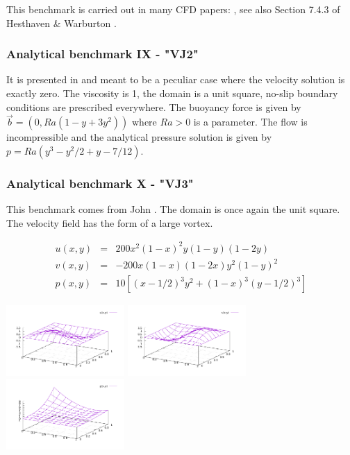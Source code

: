This benchmark is carried out in many CFD papers: \cite{coks04b,bodi11,ngpe12}, see also Section 7.4.3
of Hesthaven \& Warburton \cite{hewa08}.


\bscthesis {}

\subsubsection{Analytical benchmark IX \label{mms9} - "VJ2"}

It is presented in \cite{jolm17} and meant to be a peculiar case where the velocity solution 
is exactly zero. The viscosity is 1, the domain is a unit square, no-slip boundary conditions 
are prescribed everywhere. The buoyancy force is given by $\vec{b}=(0,Ra(1-y+3y^2))$ where 
$Ra>0$ is a parameter. The flow is incompressible and the analytical pressure solution 
is given by $p=Ra(y^3-y^2/2+y-7/12)$.

\subsubsection{Analytical benchmark X \label{mms10} - "VJ3"}

This benchmark comes from John \etal \cite{jolm17}.
The domain is once again the unit square. The velocity field has the form of a large vortex.

\begin{eqnarray}
u(x,y) &=& 200x^2(1-x)^2y(1-y)(1-2y) \\
v(x,y) &=& -200x(1-x)(1-2x)y^2(1-y)^2 \\
p(x,y) &=& 10\left[(x-1/2)^3y^2+(1-x)^3(y-1/2)^3 \right]
\end{eqnarray}

\begin{center}
\includegraphics[width=4.5cm]{images/benchmark_VJ3/u.pdf}
\includegraphics[width=4.5cm]{images/benchmark_VJ3/v.pdf}
\includegraphics[width=4.5cm]{images/benchmark_VJ3/p.pdf}
\end{center}

